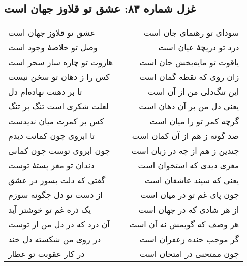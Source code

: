 \begin{center}
\section*{غزل شماره ۸۳: عشق تو قلاوز جهان است}
\label{sec:083}
\begin{longtable}{l p{0.5cm} r}
عشق تو قلاوز جهان است
&&
سودای تو رهنمای جان است
\\
وصل تو خلاصهٔ وجود است
&&
درد تو دریچهٔ عیان است
\\
هاروت تو چاره ساز سحر است
&&
یاقوت تو مایه‌بخش جان است
\\
کس را ز دهان تو سخن نیست
&&
زان روی که نقطه گمان است
\\
تا بر دهنت نهاده‌ام دل
&&
این تنگ‌دلی من از آن است
\\
لعلت شکری است تنگ بر تنگ
&&
یعنی دل من بر آن دهان است
\\
کس بر کمرت میان ندیدست
&&
گرچه کمر تو را میان است
\\
تا ابروی چون کمانت دیدم
&&
صد گونه ز هم از آن کمان است
\\
چون ابروی توست چون کمانی
&&
چندین ز هم از چه در زبان است
\\
دندان تو مغز پستهٔ توست
&&
مغزی دیدی که استخوان است
\\
گفتی که دلت بسوز در عشق
&&
یعنی که سپند عاشقان است
\\
از دست تو دل چگونه سوزم
&&
چون پای غم تو در میان است
\\
یک ذره غم تو خوشتر آید
&&
از هر شادی که در جهان است
\\
آن درد که در دل من از توست
&&
هر وصف که گویمش نه آن است
\\
در روی من شکسته دل خند
&&
گر موجب خنده زعفران است
\\
در کار عقوبت تو عطار
&&
چون ممتحنی در امتحان است
\\
\end{longtable}
\end{center}
